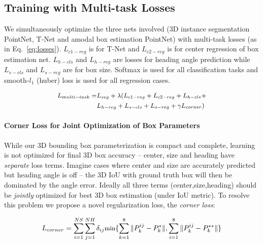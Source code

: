 \subsection{Training with Multi-task Losses}
\label{sec:losses}

We simultaneously optimize the three nets involved (3D instance segmentation PointNet, T-Net and amodal box estimation PointNet) with multi-task losses (as in Eq.~\ref{eq:losses}).
$L_{c1-reg}$ is for T-Net and $L_{c2-reg}$ is for center regression of box estimation net. $L_{h-cls}$ and $L_{h-reg}$ are losses for heading angle prediction while $L_{s-cls}$ and $L_{s-reg}$ are for box size.
Softmax is used for all classification tasks and smooth-$l_1$ (huber) loss is used for all regression cases.

\vspace{-1mm}
\begin{equation}
\small
\label{eq:losses}
\begin{split}
    L_{multi-task} = & L_{seg} + \lambda (L_{c1-reg} + L_{c2-reg} + L_{h-cls} + \\
    & L_{h-reg} + L_{s-cls} + L_{s-reg} + \gamma L_{corner})
\end{split}
\end{equation}

\paragraph{Corner Loss for Joint Optimization of Box Parameters}
While our 3D bounding box parameterization is compact and complete, learning is not optimized for final 3D box accuracy -- center, size and heading have \emph{separate} loss terms. Imagine cases where center and size are accurately predicted but heading angle is off -- the 3D IoU with ground truth box will then be dominated by the angle error. Ideally all three terms (center,size,heading) should be \emph{jointly} optimized for best 3D box estimation (under IoU metric).
To resolve this problem we propose a novel regularization loss, the \emph{corner loss}:

\vspace{-1mm}

\begin{equation} 
\small
\label{eq:corner_loss}
    L_{corner} = \sum_{i=1}^{NS} \sum_{j=1}^{NH} \delta_{ij} \text{min} \{ \sum_{k=1}^{8} \| P_{k}^{ij} - P_{k}^{*}\|, \sum_{i=1}^{8} \| P_{k}^{ij} - P_{k}^{**} \| \}
\end{equation}


